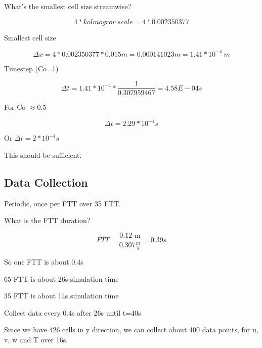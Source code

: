 \documentclass[12pt]{article}
\renewcommand{\_}{\kern-1.5pt\textunderscore\kern-1.5pt}
\begin{document}
What’s the smallest cell size streamwise?\par

 \[ 4\ast kolmogrov~scale=4\ast0.002350377 \] \par

Smallest cell size\par

 \[  \Delta x=4\ast0.002350377\ast0.015m=0.000141023m=1.41\ast10^{-4}~m \] \par

Timestep (Co=1)\par

 \[  \Delta t=1.41\ast10^{-4}\ast\frac{1}{0.307959467}=4.58E-04s \] \par

For Co \(  \approx 0.5 \) \par

 \[  \Delta t=2.29\ast10^{-4}s \] \par

Or  \(  \Delta t=2\ast10^{-4}s \) \par

This should be sufficient.\par

\subsection{Data Collection}\par

Periodic, once per FTT over 35 FTT.\par

What is the FTT duration?\par

 \[ FTT=\frac{\text{0.12 m}}{0.307\frac{m}{s}}=0.39 s \] \par

So one FTT is about 0.4s\par

65 FTT is about 26s simulation time\par

35 FTT is about 14s simulation time\par


\vspace{\baselineskip}
Collect data every 0.4s after 26s until t=40s\par

Since we have 426 cells in y direction, we can collect about 400 data points, for u, v, w and T over 16s.\par
\end{document}
